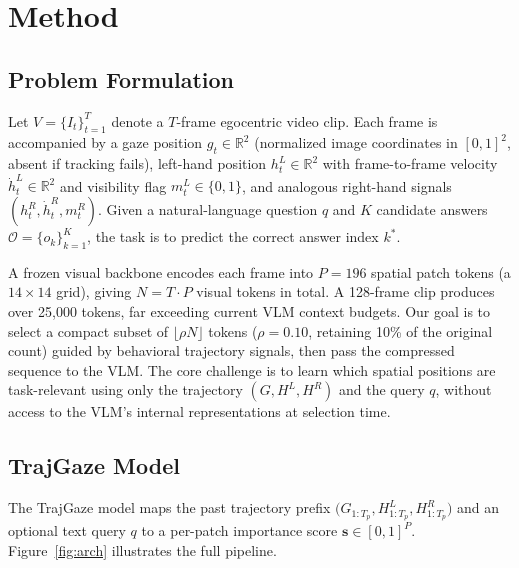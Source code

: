 \section{Method}

\subsection{Problem Formulation}

Let $V = \{I_t\}_{t=1}^{T}$ denote a $T$-frame egocentric video clip.
Each frame is accompanied by a gaze position $g_t \in \mathbb{R}^2$
(normalized image coordinates in $[0,1]^2$, absent if tracking fails),
left-hand position $h_t^L \in \mathbb{R}^2$ with frame-to-frame velocity
$\dot{h}_t^L \in \mathbb{R}^2$ and visibility flag $m_t^L \in \{0,1\}$,
and analogous right-hand signals $(h_t^R, \dot{h}_t^R, m_t^R)$.
Given a natural-language question $q$ and $K$ candidate answers
$\mathcal{O} = \{o_k\}_{k=1}^{K}$, the task is to predict the correct answer index $k^*$.

A frozen visual backbone encodes each frame into $P{=}196$ spatial patch tokens
(a $14{\times}14$ grid), giving $N = T \cdot P$ visual tokens in total.
A 128-frame clip produces over 25{,}000 tokens, far exceeding current VLM context budgets.
Our goal is to select a compact subset of $\lfloor \rho N \rfloor$ tokens
($\rho = 0.10$, retaining 10\% of the original count) guided by behavioral trajectory
signals, then pass the compressed sequence to the VLM.
The core challenge is to learn which spatial positions are task-relevant using only
the trajectory $(G, H^L, H^R)$ and the query $q$, without access to the VLM's
internal representations at selection time.


\subsection{TrajGaze Model}
\label{sec:model}

The TrajGaze model maps the past trajectory prefix
$\bigl(G_{1:T_p}, H^L_{1:T_p}, H^R_{1:T_p}\bigr)$
and an optional text query $q$ to a per-patch importance score
$\mathbf{s} \in [0,1]^P$.
Figure~\ref{fig:arch} illustrates the full pipeline.


